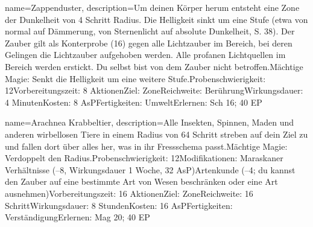 {
    name={Zappenduster},
    description={Um deinen Körper herum entsteht eine Zone der Dunkelheit von 4 Schritt Radius. Die Helligkeit sinkt um eine Stufe (etwa von normal auf Dämmerung, von Sternenlicht auf absolute Dunkelheit, S. 38). Der Zauber gilt als Konterprobe (16) gegen alle Lichtzauber im Bereich, bei deren Gelingen die Lichtzauber aufgehoben werden. Alle profanen Lichtquellen im Bereich werden erstickt. Du selbst bist von dem Zauber nicht betroffen.\newline Mächtige Magie: Senkt die Helligkeit um eine weitere Stufe.\newline Probenschwierigkeit: 12\newline Vorbereitungszeit: 8 Aktionen\newline Ziel: Zone\newline Reichweite: Berührung\newline Wirkungsdauer: 4 Minuten\newline Kosten: 8 AsP\newline Fertigkeiten: Umwelt\newline Erlernen: Sch 16; 40 EP}
}


{
    name={Arachnea Krabbeltier},
    description={Alle Insekten, Spinnen, Maden und anderen wirbellosen Tiere in einem Radius von 64 Schritt streben auf dein Ziel zu und fallen dort über alles her, was in ihr Fressschema passt.\newline Mächtige Magie: Verdoppelt den Radius.\newline Probenschwierigkeit: 12\newline Modifikationen: Maraskaner Verhältnisse (–8, Wirkungsdauer 1 Woche, 32 AsP)\newline Artenkunde (–4; du kannst den Zauber auf eine bestimmte Art von Wesen beschränken oder eine Art ausnehmen)\newline Vorbereitungszeit: 16 Aktionen\newline Ziel: Zone\newline Reichweite: 16 Schritt\newline Wirkungsdauer: 8 Stunden\newline Kosten: 16 AsP\newline Fertigkeiten: Verständigung\newline Erlernen: Mag 20; 40 EP}
}


